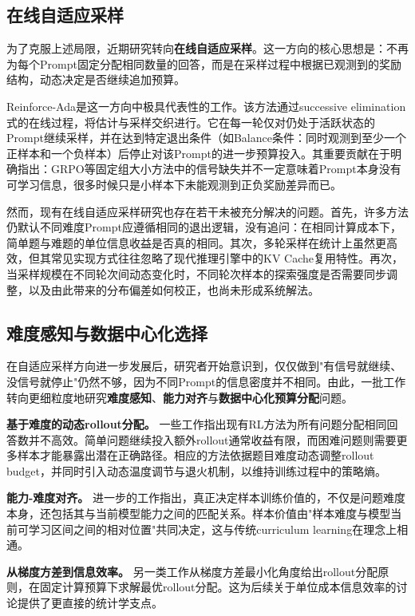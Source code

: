 \subsection{在线自适应采样}
\label{subsec:online_adaptive_sampling}

为了克服上述局限，近期研究转向\textbf{在线自适应采样}。这一方向的核心思想是：不再为每个Prompt固定分配相同数量的回答，而是在采样过程中根据已观测到的奖励结构，动态决定是否继续追加预算。

Reinforce-Ada是这一方向中极具代表性的工作。该方法通过successive elimination式的在线过程，将估计与采样交织进行。它在每一轮仅对仍处于活跃状态的Prompt继续采样，并在达到特定退出条件（如Balance条件：同时观测到至少一个正样本和一个负样本）后停止对该Prompt的进一步预算投入。其重要贡献在于明确指出：GRPO等固定组大小方法中的信号缺失并不一定意味着Prompt本身没有可学习信息，很多时候只是小样本下未能观测到正负奖励差异而已。

然而，现有在线自适应采样研究也存在若干未被充分解决的问题。首先，许多方法仍默认不同难度Prompt应遵循相同的退出逻辑，没有追问：在相同计算成本下，简单题与难题的单位信息收益是否真的相同。其次，多轮采样在统计上虽然更高效，但其常见实现方式往往忽略了现代推理引擎中的KV Cache复用特性。再次，当采样规模在不同轮次间动态变化时，不同轮次样本的探索强度是否需要同步调整，以及由此带来的分布偏差如何校正，也尚未形成系统解法。

\subsection{难度感知与数据中心化选择}
\label{subsec:difficulty_aware_selection}

在自适应采样方向进一步发展后，研究者开始意识到，仅仅做到"有信号就继续、没信号就停止"仍然不够，因为不同Prompt的信息密度并不相同。由此，一批工作转向更细粒度地研究\textbf{难度感知}、\textbf{能力对齐}与\textbf{数据中心化预算分配}问题。

\textbf{基于难度的动态rollout分配。} 一些工作指出现有RL方法为所有问题分配相同回答数并不高效。简单问题继续投入额外rollout通常收益有限，而困难问题则需要更多样本才能暴露出潜在正确路径。相应的方法依据题目难度动态调整rollout budget，并同时引入动态温度调节与退火机制，以维持训练过程中的策略熵。

\textbf{能力-难度对齐。} 进一步的工作指出，真正决定样本训练价值的，不仅是问题难度本身，还包括其与当前模型能力之间的匹配关系。样本价值由"样本难度与模型当前可学习区间之间的相对位置"共同决定，这与传统curriculum learning在理念上相通。

\textbf{从梯度方差到信息效率。} 另一类工作从梯度方差最小化角度给出rollout分配原则，在固定计算预算下求解最优rollout分配。这为后续关于单位成本信息效率的讨论提供了更直接的统计学支点。

